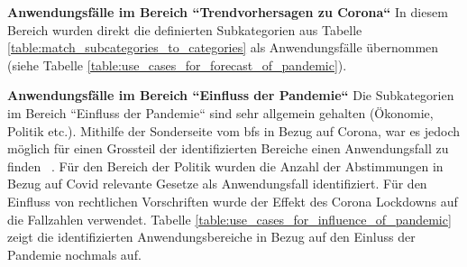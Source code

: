 \begin{table}[h]
\centering
{}
\caption{Zuordnung der Anwendungsfälle für die Kategorie ``Schweregrad der Pandemie`` (Eigene Darstellung)}
\label{table:use_cases_for_severity_of_pandemic}
\end{table}

\clearpage
\noindent
\textbf{Anwendungsfälle im Bereich ``Trendvorhersagen zu Corona``}
\newline
\indent
In diesem Bereich wurden direkt die definierten Subkategorien aus Tabelle \ref{table:match_subcategories_to_categories} als Anwendungsfälle übernommen (siehe Tabelle \ref{table:use_cases_for_forecast_of_pandemic}).

\begin{table}[h]
\centering
{}
\caption{Zuordnung der Anwendungsfälle für die Kategorie ``Trendvorhersagen zu Corona`` (Eigene Darstellung)}
\label{table:use_cases_for_forecast_of_pandemic}
\end{table}

\noindent
\textbf{Anwendungsfälle im Bereich ``Einfluss der Pandemie``}
\newline
\indent
Die Subkategorien im Bereich ``Einfluss der Pandemie`` sind sehr allgemein gehalten (Ökonomie, Politik etc.). Mithilfe der Sonderseite vom \gls{bfs} in Bezug auf Corona, war es jedoch möglich für einen Grossteil der identifizierten Bereiche einen Anwendungsfall zu finden ~\citep{bfs_covid19_page}. Für den Bereich der Politik wurden die Anzahl der Abstimmungen in Bezug auf Covid relevante Gesetze als Anwendungsfall identifiziert. Für den Einfluss von rechtlichen Vorschriften wurde der Effekt des Corona Lockdowns auf die Fallzahlen verwendet. Tabelle \ref{table:use_cases_for_influence_of_pandemic} zeigt die identifizierten Anwendungsbereiche in Bezug auf den Einluss der Pandemie nochmals auf.

